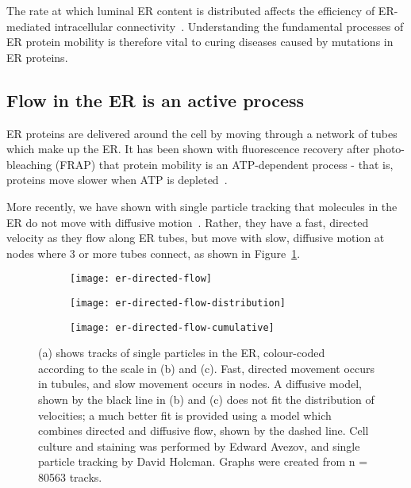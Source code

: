The rate at which luminal ER content is distributed affects the efficiency of ER-mediated intracellular connectivity~\cite{hubner2014membrane, blackstone2011hereditary}. 
Understanding the fundamental processes of ER protein mobility is therefore vital to curing diseases caused by mutations in ER proteins.

\subsection{Flow in the ER is an active process}
ER proteins are delivered around the cell by moving through a network of tubes which make up the ER. 
It has been shown with fluorescence recovery after photo-bleaching (FRAP) that protein mobility is an ATP-dependent process - that is, proteins move slower when ATP is depleted~\cite{dayel1999diffusion, nehls2000dynamics}.

More recently, we have shown with single particle tracking that molecules in the ER do not move with diffusive motion~\cite{holcman2018single}. 
Rather, they have a fast, directed velocity as they flow along ER tubes, but move with slow, diffusive motion at nodes where 3 or more tubes connect, as shown in Figure~\ref{fig:er-directed-flow-velocity}. 

\begin{figure}[p]
\centering
	\begin{subfigure}[b]{0.4\textwidth}
		\texttt{[image: er-directed-flow]}
		\caption{} \label{fig:er-directed-flow-velocity}
	\end{subfigure}	
	\hfill
	\begin{subfigure}[b]{0.29\textwidth}
		\texttt{[image: er-directed-flow-distribution]}
		\caption{} \label{fig:er-directed-flow-distribution}
	\end{subfigure}
	\hfill
	\begin{subfigure}[b]{0.29\textwidth}
		\texttt{[image: er-directed-flow-cumulative]}
		\caption{} \label{fig:er-directed-flow-cumulative}
	\end{subfigure}	
\caption[ER: Single particle tracking reveals directed flow in ER tubules]{(a) shows tracks of single particles in the ER, colour-coded according to the scale in (b) and (c). Fast, directed movement occurs in tubules, and slow movement occurs in nodes. A diffusive model, shown by the black line in (b) and (c) does not fit the distribution of velocities; a much better fit is provided using a model which combines directed and diffusive flow, shown by the dashed line. Cell culture and staining was performed by Edward Avezov, and single particle tracking by David Holcman. Graphs were created from n = \num{80563} tracks. } 
\label{fig:ER-directed-flow-velocity}
\end{figure}

